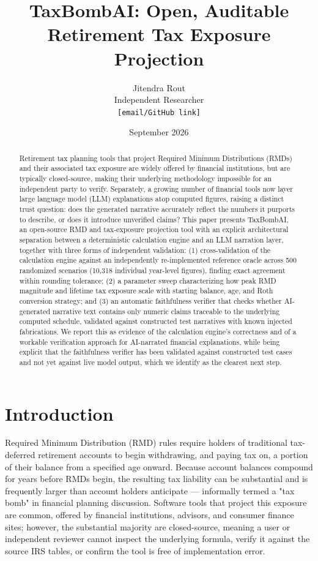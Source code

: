 \documentclass[11pt]{article}
\title{TaxBombAI: Open, Auditable Retirement Tax Exposure Projection}
\author{Jitendra Rout \\ \small Independent Researcher \\ \small \texttt{[email/GitHub link]}}
\date{September 2026}
\begin{document}
\maketitle

\begin{abstract}
Retirement tax planning tools that project Required Minimum Distributions
(RMDs) and their associated tax exposure are widely offered by financial
institutions, but are typically closed-source, making their underlying
methodology impossible for an independent party to verify. Separately, a
growing number of financial tools now layer large language model (LLM)
explanations atop computed figures, raising a distinct trust question: does
the generated narrative accurately reflect the numbers it purports to
describe, or does it introduce unverified claims? This paper presents
TaxBombAI, an open-source RMD and tax-exposure projection tool with an
explicit architectural separation between a deterministic calculation
engine and an LLM narration layer, together with three forms of
independent validation: (1) cross-validation of the calculation engine
against an independently re-implemented reference oracle across 500
randomized scenarios (10,318 individual year-level figures), finding
exact agreement within rounding tolerance; (2) a parameter sweep
characterizing how peak RMD magnitude and lifetime tax exposure scale
with starting balance, age, and Roth conversion strategy; and (3) an
automatic faithfulness verifier that checks whether AI-generated
narrative text contains only numeric claims traceable to the underlying
computed schedule, validated against constructed test narratives with
known injected fabrications. We report this as evidence of the
calculation engine's correctness and of a workable verification approach
for AI-narrated financial explanations, while being explicit that the
faithfulness verifier has been validated against constructed test cases
and not yet against live model output, which we identify as the clearest
next step.
\end{abstract}

\section{Introduction}

Required Minimum Distribution (RMD) rules require holders of traditional
tax-deferred retirement accounts to begin withdrawing, and paying tax on,
a portion of their balance from a specified age onward. Because account
balances compound for years before RMDs begin, the resulting tax
liability can be substantial and is frequently larger than account
holders anticipate — informally termed a "tax bomb" in financial
planning discussion. Software tools that project this exposure are
common, offered by financial institutions, advisors, and consumer
finance sites; however, the substantial majority are closed-source,
meaning a user or independent reviewer cannot inspect the underlying
formula, verify it against the source IRS tables, or confirm the tool is
free of implementation error.
\end{document}
